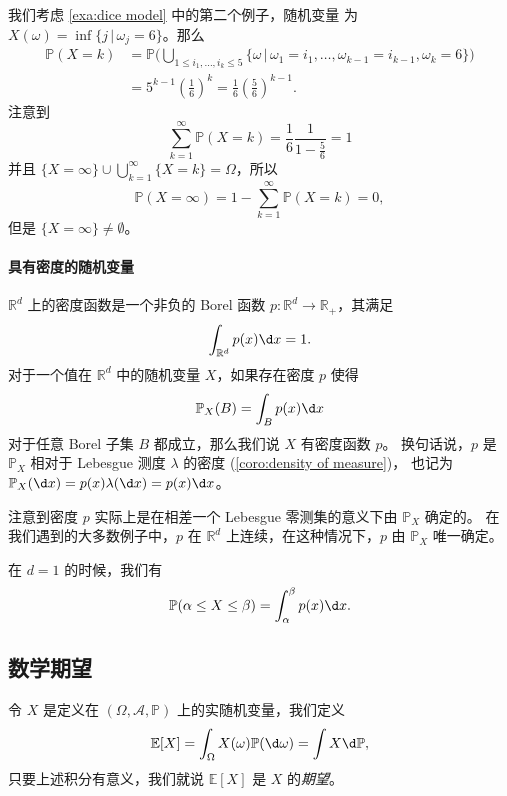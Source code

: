\documentclass[fontset=none]{Notes}
\begin{document}
\begin{example}
  我们考虑 \eqref{exa:dice model} 中的第二个例子，随机变量
  为 $X(\omega)=\inf\{j\,|\,\omega_j=6\}$。那么
  \begin{align*}
    \mathbb{P}(X=k)&=\mathbb{P}
    \biggl(\bigcup_{1\leq i_1,\dots,i_k\leq 5}\{\omega\,|\, 
    \omega_1=i_1,\dots,\omega_{k-1}=i_{k-1},\omega_k=6\}\biggr)\\
    &=5^{k-1}\left(\frac{1}{6}\right)^k=\frac{1}{6}\left(\frac{5}{6}\right)^{k-1}.
  \end{align*}
  注意到
  \[
    \sum_{k=1}^\infty \mathbb{P}(X=k)=\frac{1}{6}\frac{1}{1-\frac{5}{6}}=1
  \]
  并且 $\{X=\infty\}\cup\bigcup_{k=1}^\infty \{X=k\}=\Omega$，所以
  \[
    \mathbb{P}(X=\infty)=1-\sum_{k=1}^\infty \mathbb{P}(X=k)=0,
  \]  
  但是 $\{X=\infty\}\neq\emptyset$。
\end{example}

\paragraph{具有密度的随机变量} $\mathbb{R}^d$ 上的密度函数是一个非负的 Borel 函数
$p:\mathbb{R}^d\to \mathbb{R}_+$，其满足 
\[
  \int_{\mathbb{R}^d} p(x)\d x=1.
\]
对于一个值在 $\mathbb{R}^d$ 中的随机变量 $X$，如果存在密度 $p$ 使得
\[
  \mathbb{P}_X(B)=\int_B p(x)\d x
\]
对于任意 Borel 子集 $B$ 都成立，那么我们说 $X$ 有密度函数 $p$。
换句话说，$p$ 是 $\mathbb{P}_X$ 相对于 Lebesgue 测度 $\lambda$ 的密度
(\autoref{coro:density of measure})，
也记为 $\mathbb{P}_X(\d x)=p(x)\lambda(\d x)=p(x)\d x$。

注意到密度 $p$ 实际上是在相差一个 Lebesgue 零测集的意义下由 $\mathbb{P}_X$ 确定的。
在我们遇到的大多数例子中，$p$ 在 $\mathbb{R}^d$ 上连续，在这种情况下，$p$ 由
$\mathbb{P}_X$ 唯一确定。

在 $d=1$ 的时候，我们有
\[
  \mathbb{P}(\alpha\leq X\leq \beta)=\int_{\alpha}^\beta p(x)\d x.
\]

\subsection{数学期望}

\begin{definition}
  令 $X$ 是定义在 $(\Omega,\mathcal{A},\mathbb{P})$ 上的实随机变量，我们定义
  \[
    \mathbb{E}[X]=\int_\Omega X(\omega)\mathbb{P}(\d\omega)=\int X\d \mathbb{P},
  \]
  只要上述积分有意义，我们就说 $\mathbb{E}[X]$ 是 $X$ 的\emph{期望}。
\end{definition}
\end{document}
